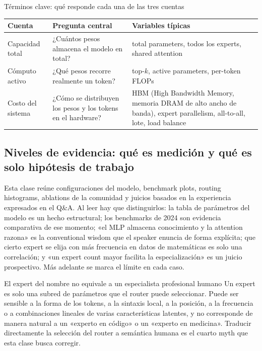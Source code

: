 \documentclass[a4paper]{article}
\begin{document}
\begin{knowledgebox}{Términos clave: qué responde cada una de las tres cuentas}
\begin{tabularx}{\textwidth}{L{0.18\textwidth} L{0.28\textwidth} X}
\toprule
Cuenta & Pregunta central & Variables típicas \\
\midrule
Capacidad total & ¿Cuántos pesos almacena el modelo en total? & total parameters, todos los experts, shared attention \\
Cómputo activo & ¿Qué pesos recorre realmente un token? & top-$k$, active parameters, per-token FLOPs \\
Costo del sistema & ¿Cómo se distribuyen los pesos y los tokens en el hardware? & HBM (High Bandwidth Memory, memoria DRAM de alto ancho de banda), expert parallelism, all-to-all, lote, load balance \\
\bottomrule
\end{tabularx}
\end{knowledgebox}


\subsection{Niveles de evidencia: qué es medición y qué es solo hipótesis de trabajo}

Esta clase reúne configuraciones del modelo, benchmark plots, routing histograms, ablations de la comunidad y juicios basados en la experiencia expresados en el Q\&A. Al leer hay que distinguirlos: la tabla de parámetros del modelo es un hecho estructural; los benchmarks de 2024 son evidencia comparativa de ese momento; «el MLP almacena conocimiento y la attention razona» es la conventional wisdom que el speaker enuncia de forma explícita; que cierto expert se elija con más frecuencia en datos de matemáticas es solo una correlación; y «un expert count mayor facilita la especialización» es un juicio prospectivo. Más adelante se marca el límite en cada caso.

\begin{warningbox}{El expert del nombre no equivale a un especialista profesional humano}
Un expert es solo una subred de parámetros que el router puede seleccionar. Puede ser sensible a la forma de los tokens, a la sintaxis local, a la posición, a la frecuencia o a combinaciones lineales de varias características latentes, y no corresponde de manera natural a un «experto en código» o un «experto en medicina». Traducir directamente la selección del router a semántica humana es el cuarto myth que esta clase busca corregir.
\end{warningbox}
\end{document}
